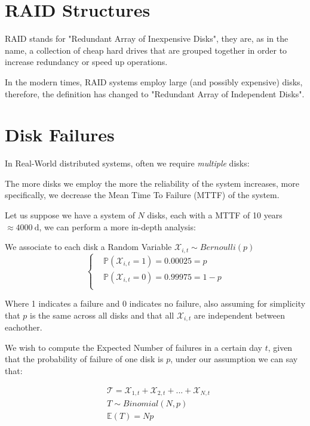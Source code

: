 \documentclass[openright, twoside]{report}
\theoremstyle{definition}
\theoremstyle{example}
\begin{document}
\section{RAID Structures}
RAID stands for "Redundant Array of Inexpensive Disks", they are, as in the name, a collection 
of cheap hard drives that are grouped together in order to increase redundancy or speed up operations.

In the modern times, RAID systems employ large (and possibly expensive) disks, therefore, the 
definition has changed to "Redundant Array of Independent Disks".

\section{Disk Failures}
In Real-World distributed systems, often we require \emph{multiple} disks:

\begin{center}
The more disks we employ the more the reliability of the system increases, more specifically, 
we decrease the Mean Time To Failure (MTTF) of the system.
\end{center}

Let us suppose we have a system of $N$ disks, each with a MTTF of 10 years $\approx \SI[group-separator = \ ]{4000}{\day}$,
we can perform a more in-depth analysis:

We associate to each disk a Random Variable $\mathcal{X}_{i,t} \sim Bernoulli(p)$
\[
\begin{cases}
	&\mathbb{P}(\mathcal{X}_{i,t} = 1) = 0.00025 = p\\
	&\mathbb{P}(\mathcal{X}_{i,t} = 0) = 0.99975 = 1-p\\
\end{cases}
\]

Where 1 indicates a failure and 0 indicates no failure, also assuming for 
simplicity that $p$ is the same across all disks and that all $\mathcal{X}_{i,t}$
are independent between eachother.

We wish to compute the Expected Number of failures in a certain day $t$, given 
that the probability of failure of one disk is $p$, under our assumption we can 
say that:

\begin{align*}
	& \mathcal{T} = \mathcal{X}_{1,t} + \mathcal{X}_{2, t} + ... + \mathcal{X}_{N,t}\\
	& T \sim Binomial(N, p) \\
	& \mathbb{E}(T) = Np 
\end{align*}
\end{document}
